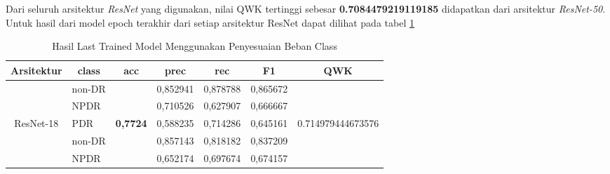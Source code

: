 Dari seluruh arsitektur \emph{ResNet} yang digunakan, nilai QWK tertinggi sebesar \textbf{0.7084479219119185} didapatkan dari arsitektur \emph{ResNet-50}. Untuk hasil dari model epoch terakhir dari setiap arsitektur ResNet dapat dilihat pada tabel \ref{tb:HasilLastClassWeight}

\pagebreak

\begin{table}[hbtp]
	\begin{center}
		\caption{Hasil Last Trained Model Menggunakan Penyesuaian Beban Class}
		\label{tb:HasilLastClassWeight}
		\begin{tabular}{|c|l|c|l|l|l|c|}
			\hline
			\rowcolor[HTML]{C0C0C0} 
			Arsitektur & \multicolumn{1}{c|}{\cellcolor[HTML]{C0C0C0}class} & acc                      & \multicolumn{1}{c|}{\cellcolor[HTML]{C0C0C0}prec} & \multicolumn{1}{c|}{\cellcolor[HTML]{C0C0C0}rec} & \multicolumn{1}{c|}{\cellcolor[HTML]{C0C0C0}F1} & QWK                                  \\ \hline
			& non-DR                                             &                          & 0,852941                                          & 0,878788                                         & 0,865672                                        &                                      \\ \cline{2-2} \cline{4-6}
			& NPDR                                               &                          & 0,710526                                          & 0,627907                                         & 0,666667                                        &                                      \\ \cline{2-2} \cline{4-6}
			\multirow{-3}{*}{ResNet-18}  & PDR                                                & \multirow{-3}{*}{\textbf{0,7724}} & 0,588235                                 & 0,714286                                         & 0,645161                                        & \multirow{-3}{*}{0.714979444673576}  \\ \hline
			& non-DR                                             &                          & 0,857143                                          & 0,818182                                         & 0,837209                                        &                                      \\ \cline{2-2} \cline{4-6}
			& NPDR                                               &                          & 0,652174                                          & 0,697674                                         & 0,674157                                        &                                      \\ \cline{2-2} \cline{4-6}

\end{tabular}
\end{center}
\end{table}
